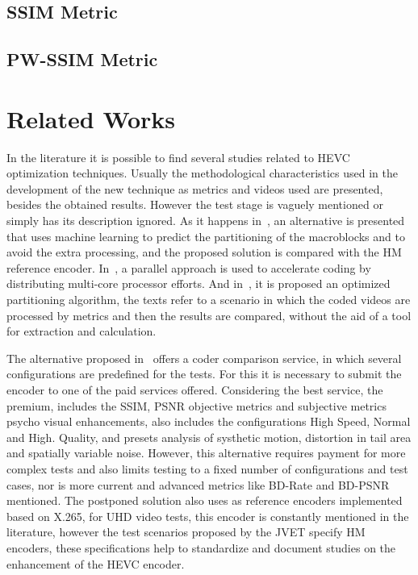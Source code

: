 \documentclass{acm_proc_article-sp}
\begin{document}




\subsection{SSIM Metric}

\subsection{PW-SSIM Metric}

\section{Related Works}


In the literature it is possible to find several studies related to HEVC optimization techniques. Usually the methodological characteristics used in the development of the new technique as metrics and videos used are presented, besides the obtained results. However the test stage is vaguely mentioned or simply has its description ignored. As it happens in~\cite{oliveira:16}, an alternative is presented that uses machine learning to predict the partitioning of the macroblocks and to avoid the extra processing, and the proposed solution is compared with the HM reference encoder. In~\cite{Wang:16}, a parallel approach is used to accelerate coding by distributing multi-core processor efforts. And in~\cite{wang:13}, it is proposed an optimized partitioning algorithm, the texts refer to a scenario in which the coded videos are processed by metrics and then the results are compared, without the aid of a tool for extraction and calculation.


The alternative proposed in~\cite{msu:16} offers a coder comparison service, in which several configurations are predefined for the tests. For this it is necessary to submit the encoder to one of the paid services offered. Considering the best service, the premium, includes the SSIM, PSNR objective metrics and subjective metrics psycho visual enhancements, also includes the configurations High Speed, Normal and High. Quality, and presets analysis of systhetic motion, distortion in tail area and spatially variable noise. However, this alternative requires payment for more complex tests and also limits testing to a fixed number of configurations and test cases, nor is more current and advanced metrics like BD-Rate and BD-PSNR mentioned. The postponed solution also uses as reference encoders implemented based on X.265, for UHD video tests, this encoder is constantly mentioned in the literature, however the test scenarios proposed by the JVET specify HM encoders, these specifications help to standardize and document studies on the enhancement of the HEVC encoder.
\end{document}

